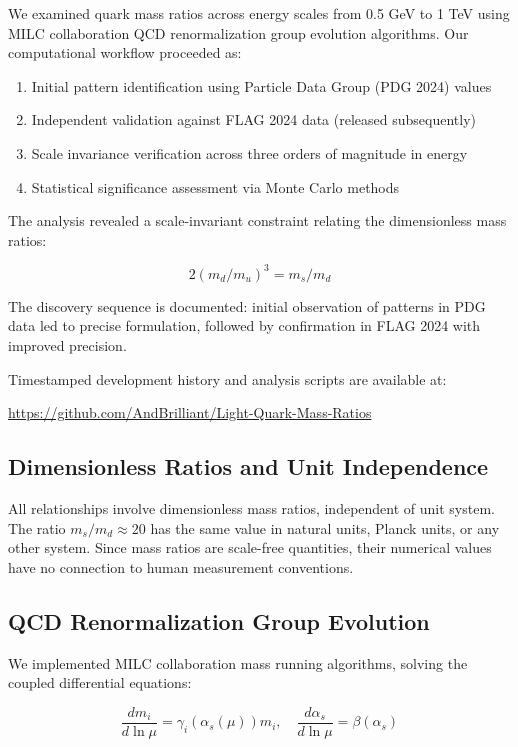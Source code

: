 \documentclass[12pt]{article}
\begin{document}
We examined quark mass ratios across energy scales from 0.5 GeV to 1 TeV using MILC collaboration QCD renormalization group evolution algorithms. Our computational workflow proceeded as:

\begin{enumerate}
\item Initial pattern identification using Particle Data Group (PDG 2024) values
\item Independent validation against FLAG 2024 data (released subsequently)
\item Scale invariance verification across three orders of magnitude in energy
\item Statistical significance assessment via Monte Carlo methods
\end{enumerate}

The analysis revealed a scale-invariant constraint relating the dimensionless mass ratios:

\begin{equation}
2(m_d/m_u)^3 = m_s/m_d
\end{equation}

The discovery sequence is documented: initial observation of patterns in PDG data led to precise formulation, followed by confirmation in FLAG 2024 with improved precision.

Timestamped development history and analysis scripts are available at:

\url{https://github.com/AndBrilliant/Light-Quark-Mass-Ratios}

\subsection{Dimensionless Ratios and Unit Independence}

All relationships involve dimensionless mass ratios, independent of unit system. The ratio $m_s/m_d \approx 20$ has the same value in natural units, Planck units, or any other system. Since mass ratios are scale-free quantities, their numerical values have no connection to human measurement conventions.

\subsection{QCD Renormalization Group Evolution}

We implemented MILC collaboration mass running algorithms, solving the coupled differential equations:

\begin{equation}
\frac{dm_i}{d\ln\mu} = \gamma_i(\alpha_s(\mu))m_i,\quad \frac{d\alpha_s}{d\ln\mu} = \beta(\alpha_s)
\end{equation}
\end{document}
